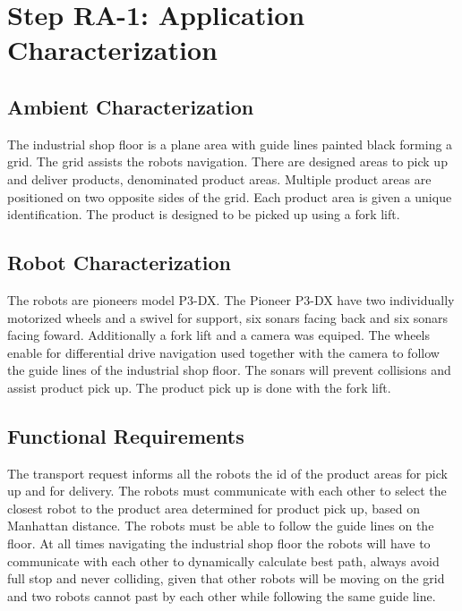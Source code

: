 \section{Step RA-1: Application Characterization}

\subsection{Ambient Characterization}
The industrial shop floor is a plane area with guide lines painted black forming a grid. The grid assists the robots navigation. There are designed areas to pick up and deliver products, denominated product areas. Multiple product areas are positioned on two opposite sides of the grid. Each product area is given a unique identification. The product is designed to be picked up using a fork lift.

\subsection{Robot Characterization}
The robots are pioneers model P3-DX. The Pioneer P3-DX have two individually motorized wheels and a swivel for support, six sonars facing back and six sonars facing foward. Additionally a fork lift and a camera was equiped. The wheels enable for differential drive navigation used together with the camera to follow the guide lines of the industrial shop floor. The sonars will prevent collisions and assist product pick up. The product pick up is done with the fork lift.

\subsection{Functional Requirements}
The transport request informs all the robots the id of the product areas for pick up and for delivery. The robots must communicate with each other to select the closest robot to the product area determined for product pick up, based on Manhattan distance.%
The robots must be able to follow the guide lines on the floor. At all times navigating the industrial shop floor the robots will have to communicate with each other to dynamically calculate best path, always avoid full stop and never colliding, given that other robots will be moving on the grid and two robots cannot past by each other while following the same guide line.

